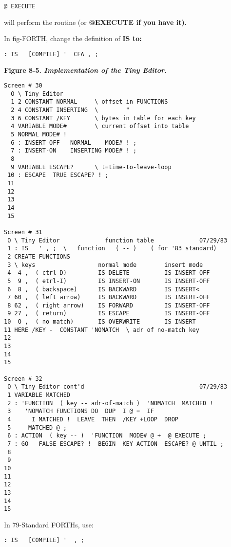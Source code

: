 \begin{verbatim}
@ EXECUTE
\end{verbatim}

will perform the routine (or \bf{@EXECUTE} if you have it).

In fig-FORTH, change the definition of \bf{IS} to:

\begin{verbatim}
: IS   [COMPILE] '  CFA , ;
\end{verbatim}

\bf{Figure 8-5.} \emph{Implementation of the Tiny Editor.}

\begin{verbatim}
Screen # 30
  O \ Tiny Editor
  1 2 CONSTANT NORMAL     \ offset in FUNCTIONS
  2 4 CONSTANT INSERTING  \        "
  3 6 CONSTANT /KEY       \ bytes in table for each key
  4 VARIABLE MODE#        \ current offset into table
  5 NORMAL MODE# !
  6 : INSERT-OFF   NORMAL    MODE# ! ;
  7 : INSERT-ON    INSERTING MODE# ! ;
  8
  9 VARIABLE ESCAPE?      \ t=time-to-leave-loop
 10 : ESCAPE  TRUE ESCAPE? ! ;
 11
 12
 13
 14
 15

Screen # 31
 O \ Tiny Editor             function table             07/29/83
 1 : IS   ' , ;  \   function   ( -- )    ( for '83 standard)
 2 CREATE FUNCTIONS
 3 \ keys                  normal mode        insert mode
 4  4 ,  ( ctrl-D)         IS DELETE          IS INSERT-OFF
 5  9 ,  ( etrl-I)         IS INSERT-ON       IS INSERT-OFF
 6  8 ,  ( backspace)      IS BACKWARD        IS INSERT<
 7 60 ,  ( left arrow)     IS BACKWARD        IS INSERT-OFF
 8 62 ,  ( right arrow)    IS FORWARD         IS INSERT-OFF
 9 27 ,  ( return)         IS ESCAPE          IS INSERT-OFF
10  O ,  ( no match)       IS OVERWRITE       IS INSERT
11 HERE /KEY -  CONSTANT 'NOMATCH  \ adr of no-match key
12
13
14
15

Screen # 32
 O \ Tiny Editor cont'd                                 07/29/83
 1 VARIABLE MATCHED
 2 : 'FUNCTION  ( key -- adr-of-match )  'NOMATCH  MATCHED !
 3    'NOMATCH FUNCTIONS DO  DUP  I @ =  IF
 4      I MATCHED !  LEAVE  THEN  /KEY +LOOP  DROP
 5     MATCHED @ ;
 6 : ACTION  ( key -- )  'FUNCTION  MODE# @ +  @ EXECUTE ;
 7 : GO   FALSE ESCAPE? !  BEGIN  KEY ACTION  ESCAPE? @ UNTIL ;
 8
 9
10
11
12
13
14
15
\end{verbatim}

In 79-Standard FORTHs, use:

\begin{verbatim}
: IS   [COMPILE] '  , ;
\end{verbatim}


